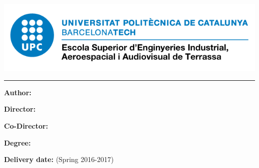 
\thispagestyle{CoverPage}

\begin{center}
\includegraphics[scale=0.5]{./doc_config/image}\par
\vspace{1cm}
{\scshape\Large \School \par}
\vspace{1cm}
{\huge\bfseries \ProjectName\par}
\textcolor{cyan}{\rule{\textwidth}{.6pt}}
\vspace{2cm}
{\Large \DocType\par}
\vfill
\end{center}

\vspace{10pt}
\textbf{Author:} \Author

\textbf{Director:} \Director

\textbf{Co-Director:} \Codirector

\textbf{Degree:} \Degree

\textbf{Delivery date:} \DocDate (Spring 2016-2017)
\vspace{10pt}
